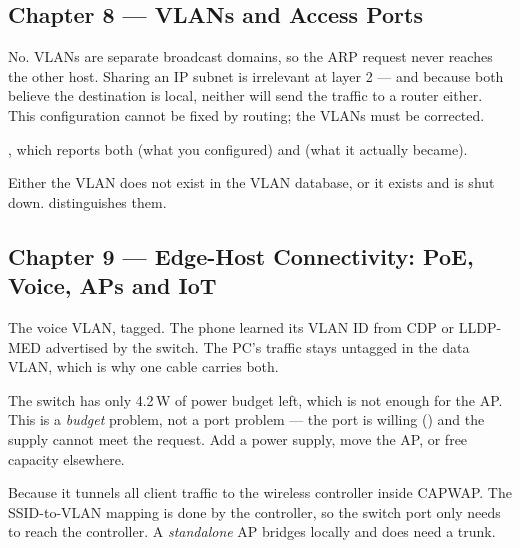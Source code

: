 \subsection*{Chapter 8 --- VLANs and Access Ports}
\begin{tightnum}
  \item No. VLANs are separate broadcast domains, so the ARP request never reaches
        the other host. Sharing an IP subnet is irrelevant at layer 2 --- and
        because both believe the destination is local, neither will send the
        traffic to a router either. This configuration cannot be fixed by
        routing; the VLANs must be corrected.
  \item {}, which reports both
         (what you configured) and  (what it actually became).
  \item Either the VLAN does not exist in the VLAN database, or it exists and is
        shut down.  distinguishes them.
\end{tightnum}

\subsection*{Chapter 9 --- Edge-Host Connectivity: PoE, Voice, APs and IoT}
\begin{tightnum}
  \item The voice VLAN, tagged. The phone learned its VLAN ID from CDP or LLDP-MED
        advertised by the switch. The PC's traffic stays untagged in the data
        VLAN, which is why one cable carries both.
  \item The switch has only 4.2\,W of power budget left, which is not enough for
        the AP. This is a \emph{budget} problem, not a port problem --- the port
        is willing () and the supply cannot meet the request. Add a
        power supply, move the AP, or free capacity elsewhere.
  \item Because it tunnels all client traffic to the wireless controller inside
        CAPWAP. The SSID-to-VLAN mapping is done by the controller, so the switch
        port only needs to reach the controller. A \emph{standalone} AP bridges
        locally and does need a trunk.
\end{tightnum}

